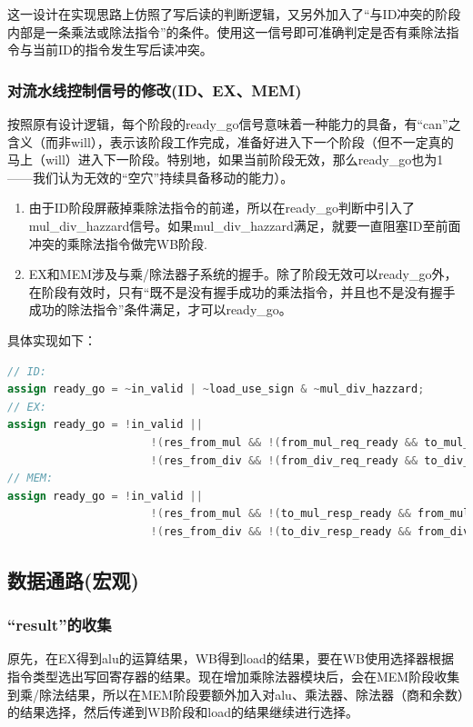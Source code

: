 \documentclass[11pt]{article}
\begin{document}
这一设计在实现思路上仿照了写后读的判断逻辑，又另外加入了“与ID冲突的阶段内部是一条乘法或除法指令”的条件。使用这一信号即可准确判定是否有乘除法指令与当前ID的指令发生写后读冲突。


\subsubsection{对流水线控制信号的修改(ID、EX、MEM)}

按照原有设计逻辑，每个阶段的ready_go信号意味着一种能力的具备，有“can”之含义（而非will），表示该阶段工作完成，准备好进入下一个阶段（但不一定真的马上（will）进入下一阶段。特别地，如果当前阶段无效，那么ready_go也为1——我们认为无效的“空穴”持续具备移动的能力）。

\begin{enumerate}
    \item 由于ID阶段屏蔽掉乘除法指令的前递，所以在ready_go判断中引入了mul_div_hazzard信号。如果mul_div_hazzard满足，就要一直阻塞ID至前面冲突的乘除法指令做完WB阶段.
    \item EX和MEM涉及与乘/除法器子系统的握手。除了阶段无效可以ready_go外，在阶段有效时，只有“既不是没有握手成功的乘法指令，并且也不是没有握手成功的除法指令”条件满足，才可以ready_go。
\end{enumerate}
具体实现如下：

\begin{lstlisting}[language=Verilog, caption={修改后的ready_go}]
// ID:
assign ready_go = ~in_valid | ~load_use_sign & ~mul_div_hazzard;
// EX:
assign ready_go = !in_valid ||
					  !(res_from_mul && !(from_mul_req_ready && to_mul_req_valid)) &&
					  !(res_from_div && !(from_div_req_ready && to_div_req_valid));
// MEM:
assign ready_go = !in_valid ||
                      !(res_from_mul && !(to_mul_resp_ready && from_mul_resp_valid)) &&
                      !(res_from_div && !(to_div_resp_ready && from_div_resp_valid));
\end{lstlisting}




\subsection{数据通路(宏观)}

\subsubsection{“result”的收集}
原先，在EX得到alu的运算结果，WB得到load的结果，要在WB使用选择器根据指令类型选出写回寄存器的结果。现在增加乘除法器模块后，会在MEM阶段收集到乘/除法结果，所以在MEM阶段要额外加入对alu、乘法器、除法器（商和余数）的结果选择，然后传递到WB阶段和load的结果继续进行选择。
\end{document}
